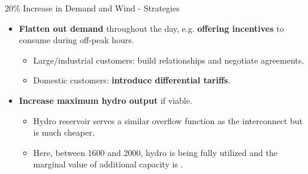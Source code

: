 \documentclass{beamer}
\begin{document}
    
    \begin{frame}{20\% Increase in Demand and Wind - Strategies}
        
        \begin{itemize}
        
            \item  \textbf{Flatten out demand} throughout the day, e.g. \textbf{offering incentives} to consume during off-peak hours.
            	
                \begin{itemize}
            
            		\item Large/industrial customers: build relationships and negotiate agreements.
            
            		\item Domestic customers: \textbf{introduce differential tariffs}.
            
                \end{itemize}
            
            \item \textbf{Increase maximum hydro output} if viable.
            
            	\begin{itemize}
                	
                    \item Hydro reservoir serves a similar overflow function as the interconnect but is much cheaper.
                    
                    \item Here, between 1600 and 2000, hydro is being fully utilized and the marginal value of additional capacity is .
                    
                \end{itemize}   
            
        \end{itemize}
    
    \end{frame}
    
	
\end{document}
